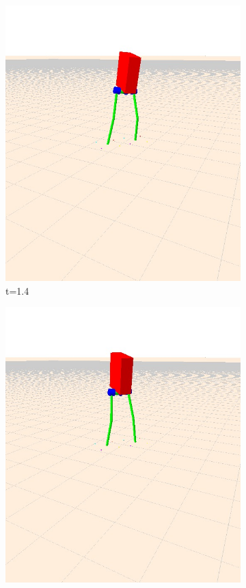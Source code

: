 \documentclass[letterpaper, 10 pt, conference]{ieeeconf}  %
\begin{document}
\begin{figure}[t]
\begin{subfigure}[b]{0.3\textwidth}
    \centering
    \includegraphics[width=\textwidth] {figures/balanceNoYaw2.jpg} 
    \caption{t=1.4}
    \label{fig:balanceNoYaw2}
  \end{subfigure}\hfill
  \begin{subfigure}[b]{0.3\textwidth}
    \centering
    \includegraphics[width=\textwidth] {figures/balanceNoYaw3.jpg} 

\end{subfigure}
\end{figure}
\end{document}
